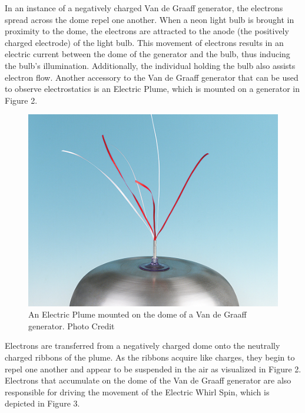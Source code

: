 \documentclass[oneside,12pt]{amsart}
\begin{document}
\indent In an instance of a negatively charged Van de Graaff generator, the electrons spread across the dome repel one another. When a neon light bulb is brought in proximity to the dome, the electrons are attracted to the anode (the positively charged electrode) of the light bulb\cite{scienceworld}. This movement of electrons results in an electric current between the dome of the generator and the bulb, thus inducing the bulb’s illumination. Additionally, the individual holding the bulb also assists electron flow. Another accessory to the Van de Graaff generator that can be used to observe electrostatics is an Electric Plume, which is mounted on a generator in Figure 2.\newpage
\begin{figure}[h]
	\includegraphics[width=\smallgraph,scale=0.01]{Plume.png}
	\caption{ An Electric Plume mounted on the dome of a Van de Graaff generator. Photo Credit \cite{Flinn}}
	\label{Plume}
\end{figure}

\indent Electrons are transferred from a negatively charged dome onto the neutrally charged ribbons of the plume. As the ribbons acquire like charges, they begin to repel one another and appear to be suspended in the air as visualized in Figure 2. Electrons that accumulate on the dome of the Van de Graaff generator are also responsible for driving the movement of the Electric Whirl Spin, which is depicted in Figure 3.\\
\end{document}
